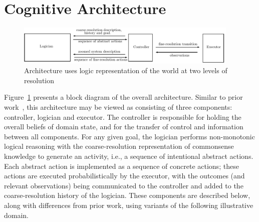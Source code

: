 \documentclass[letterpaper, 10 pt, conference]{article}  %
\begin{document}
\section{Cognitive Architecture}
\label{sec:arch}

\begin{figure}[tb]
\centering
\includegraphics[width=0.95\textwidth]{Images/architecture.pdf}
\caption{Architecture uses logic representation of the world at two
  levels of resolution}
\label{fig:arch-overview}
\end{figure}

Figure~\ref{fig:arch-overview} presents a block diagram of the overall
architecture. Similar to prior work~\cite{sridharan2017refinement},
this architecture may be viewed as consisting of three components:
controller, logician and executor. The controller is responsible for
holding the overall beliefs of domain state, and for the transfer of
control and information between all components. For any given goal,
the logician performs non-monotonic logical reasoning with the
coarse-resolution representation of commonsense knowledge to generate
an activity, i.e., a sequence of intentional abstract actions. Each
abstract action is implemented as a sequence of concrete actions;
these actions are executed probabilistically by the executor, with the
outcomes (and relevant observations) being communicated to the
controller and added to the coarse-resolution history of the logician.
These components are described below, along with differences from
prior work, using variants of the following illustrative domain.
\end{document}
